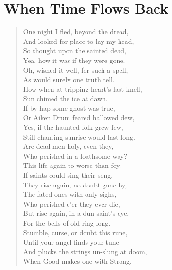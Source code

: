 \section{When Time Flows Back}

\begin{verse}
One night I fled, beyond the dread,\\
And looked for place to lay my head,\\
So thought upon the sainted dead,\\
Yea, how it was if they were gone.\\
Oh, wished it well, for such a spell,\\
As would surely one truth tell,\\
How when at tripping heart's last knell,\\
Sun chimed the ice at dawn.\\
If by hap some ghost was true,\\
Or Aiken Drum feared hallowed dew,\\
Yes, if the haunted folk grew few,\\
Still chanting sunrise would last long.\\
Are dead men holy, even they,\\
Who perished in a loathsome way?\\
This life again to worse than fey,\\
If saints could sing their song.\\
They rise again, no doubt gone by,\\
The fated ones with only sighs,\\
Who perished e'er they ever die,\\
But rise again, in a dun saint's eye,\\
For the bells of old ring long.\\
Stumble, curse, or doubt this rune,\\
Until your angel finds your tune,\\
And plucks the strings un-slung at doom,\\
When Good makes one with Strong.
\end{verse}


